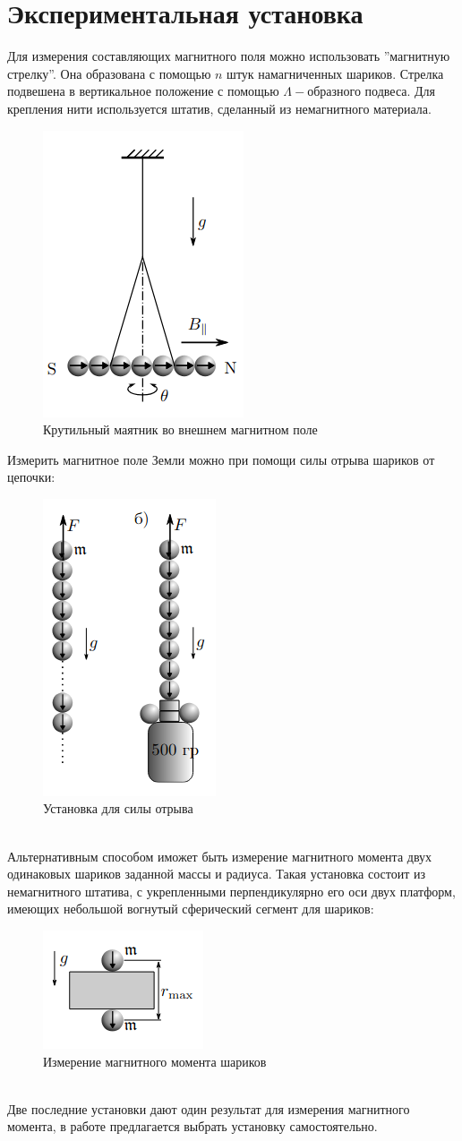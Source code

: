 \documentclass[a4paper, 12pt]{article}
\begin{document}
\section*{Экспериментальная установка}
Для измерения составляющих магнитного поля можно использовать ''магнитную стрелку''. Она образована с помощью $n$ штук намагниченных шариков. Стрелка подвешена в вертикальное положение с помощью $\Lambda-$образного подвеса. Для крепления нити используется штатив, сделанный из немагнитного материала.
\begin{figure}[h]
        \centering
        \includegraphics[width=0.25\linewidth]{p1.png}
        \caption{Крутильный маятник во внешнем магнитном поле}
        \label{Подвес}
\end{figure}
\newpage
Измерить магнитное поле Земли можно при помощи силы отрыва шариков от цепочки:
\begin{figure}[htbp]
    \centering
    \includegraphics[width=0.25\linewidth]{p2.png}
    \caption{Установка для силы отрыва}
    \label{установка для силы отрыва}
\end{figure}\\
Альтернативным способом иможет быть измерение магнитного момента двух одинаковых шариков заданной массы и радиуса.
Такая установка состоит из немагнитного штатива, с укрепленными перпендикулярно его оси двух платформ, имеющих небольшой вогнутый сферический сегмент
для шариков:
\begin{figure}[htbp]
    \centering
    \includegraphics[width=0.25\linewidth]{p3.png}
    \caption{Измерение магнитного момента шариков}
    \label{установка измерение магнитного момента шариков}
\end{figure}\\
Две последние установки дают один результат для измерения магнитного момента, в работе предлагается выбрать установку самостоятельно.
\end{document}
